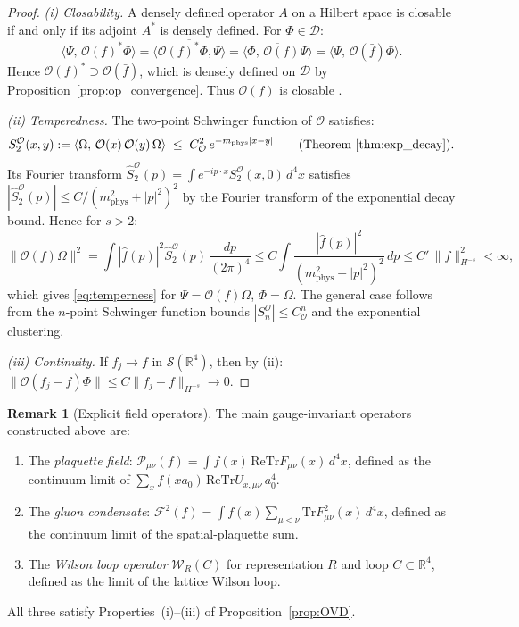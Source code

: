 \documentclass[11pt,a4paper]{amsart}
\theoremstyle{definition}
\newtheorem{remark}[theorem]{Remark}
\newcommand{\R}{\mathbb{R}}
\newcommand{\re}{\mathrm{Re}}
\newcommand{\Tr}{\mathrm{Tr}}
\begin{document}
\begin{proof}
\emph{(i) Closability.}
A densely defined operator $A$ on a Hilbert space is closable if and only if its
adjoint $A^*$ is densely defined.  For $\Phi\in\mathcal{D}$:
\[
  \langle\Psi,\,\mathcal{O}(f)^*\Phi\rangle
  = \overline{\langle\mathcal{O}(f)^*\Phi,\Psi\rangle}
  = \overline{\langle\Phi,\,\mathcal{O}(f)\Psi\rangle}
  = \langle\Psi,\,\mathcal{O}(\bar f)\Phi\rangle.
\]
Hence $\mathcal{O}(f)^*\supset\mathcal{O}(\bar f)$, which is densely defined on
$\mathcal{D}$ by Proposition~\ref{prop:op_convergence}.  Thus $\mathcal{O}(f)$
is closable \cite[Thm.~VIII.1]{Reed75}.

\emph{(ii) Temperedness.}
The two-point Schwinger function of $\mathcal{O}$ satisfies:
\[
  S_2^\mathcal{O}(x,y)
  := \langle\Omega,\,\mathcal{O}(x)\,\mathcal{O}(y)\,\Omega\rangle
  \;\le\; C_\mathcal{O}^2\,e^{-m_{\mathrm{phys}}|x-y|}
  \qquad\text{(Theorem~\ref{thm:exp_decay})}.
\]
Its Fourier transform $\hat S_2^\mathcal{O}(p) = \int e^{-ip\cdot x}S_2^\mathcal{O}(x,0)\,d^4x$
satisfies $|\hat S_2^\mathcal{O}(p)| \le C/(m_{\mathrm{phys}}^2 + |p|^2)^2$ by the
Fourier transform of the exponential decay bound.  Hence for $s > 2$:
\[
  \|\mathcal{O}(f)\Omega\|^2
  = \int |\hat f(p)|^2 \hat S_2^\mathcal{O}(p)\,\frac{dp}{(2\pi)^4}
  \le C\int \frac{|\hat f(p)|^2}{(m_{\mathrm{phys}}^2+|p|^2)^2}\,dp
  \le C'\,\|f\|_{H^{-s}}^2
  < \infty,
\]
which gives \eqref{eq:temperness} for $\Psi = \mathcal{O}(f)\Omega$, $\Phi = \Omega$.
The general case follows from the $n$-point Schwinger function bounds
$|S_n^\mathcal{O}|\le C_\mathcal{O}^n$ and the exponential clustering.

\emph{(iii) Continuity.}
If $f_j \to f$ in $\mathcal{S}(\R^4)$, then by (ii):
$\|\mathcal{O}(f_j-f)\Phi\| \le C\|f_j-f\|_{H^{-s}} \to 0$.
\end{proof}

\begin{remark}[Explicit field operators]
\label{rem:field_operators}
The main gauge-invariant operators constructed above are:
\begin{enumerate}[label=(\alph*)]
\item The \emph{plaquette field}:
  $\mathcal{P}_{\mu\nu}(f) = \int f(x)\,\re\Tr F_{\mu\nu}(x)\,d^4x$,
  defined as the continuum limit of $\sum_x f(xa_0)\,\re\Tr U_{x,\mu\nu}\,a_0^4$.
\item The \emph{gluon condensate}:
  $\mathcal{F}^2(f) = \int f(x)\sum_{\mu<\nu}\Tr F_{\mu\nu}^2(x)\,d^4x$,
  defined as the continuum limit of the spatial-plaquette sum.
\item The \emph{Wilson loop operator} $\mathcal{W}_R(C)$ for representation $R$
  and loop $C\subset\R^4$, defined as the limit of the lattice Wilson loop.
\end{enumerate}
All three satisfy Properties~(i)--(iii) of Proposition~\ref{prop:OVD}.
\end{remark}
\end{document}
